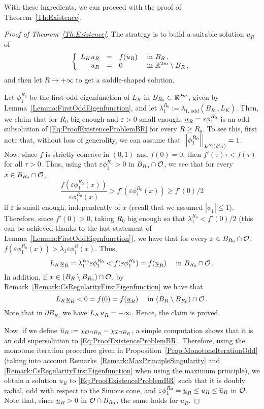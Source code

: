 With these ingredients, we can proceed with the proof of Theorem~\ref{Th:Existence}.

\begin{proof}[Proof of Theorem~\ref{Th:Existence}]
	The strategy is to build a suitable solution $u_R$ of 
	\begin{equation}
	\label{Eq:ProofExistenceProblemBR}
	\left\{\begin{array}{rcll}
	L_K u_R &=& f(u_R) & \textrm{ in } B_R\,,\\
	u_R &=& 0 & \textrm{ in }\mathbb{R}^{2m} \setminus B_R\,,
	\end{array} \right.
	\end{equation}
	and then let $R\to+ \infty$ to get a saddle-shaped solution.
	
	Let $\phi_1^{R_0}$ be the first odd eigenfunction of $L_K$ in $B_{R_0} \subset \mathbb{R}^{2m}$, given by Lemma~\ref{Lemma:FirstOddEigenfunction}, and let  $\lambda_1^{R_0} := \lambda_{1, \, \mathrm{odd}}(B_{R_0}, L_K)$. Then, we claim that for $R_0$ big enough and $\varepsilon>0$ small enough, $\underline{u}_R = \varepsilon\phi_1^{R_0} $ is an odd subsolution of \eqref{Eq:ProofExistenceProblemBR} for every $R\geq R_0$. To see this, first note that, without loss of generality, we can assume that $\left | \left |{\phi_1^{R_0}} \right | \right |_{L^\infty(B_R)}=1$. Now, since $f$ is strictly concave in $(0,1)$ and $f(0)=0$, then $f'(\tau)\tau<f(\tau)$ for all $\tau>0$. Thus, using that $\varepsilon \phi_1^{R_0}>0$ in $B_{R_0}\cap \mathcal{O}$, we see that for every $x\in B_{R_0}\cap \mathcal{O}$,
	$$
	\dfrac{f(\varepsilon \phi_1^{R_0}(x))}{\varepsilon \phi_1^{R_0}(x)} > f'(\varepsilon \phi_1^{R_0}(x)) \geq f'(0)/2
	$$
	if $\varepsilon$ is small enough, independently of $x$ (recall that we assumed $|\phi_1|\leq 1$). Therefore, since $f'(0)>0$, taking $R_0$ big enough so that $\lambda_1^{R_0} < f'(0)/2$ (this can be achieved thanks to the last statement of Lemma~\ref{Lemma:FirstOddEigenfunction}), we have that for every $x\in B_{R_0}\cap \mathcal{O}$,  $f(\varepsilon \phi_1^{R_0}(x)) > \lambda_1 \varepsilon \phi_1^R(x)$. Thus,
	$$
	L_K \underline{u}_R = \lambda_1^{R_0} \varepsilon \phi_1^{R_0} < f(\varepsilon\phi_1^{R_0}) = f(\underline{u}_R) \quad \textrm{ in } B_{R_0}\cap \mathcal{O}\,.
	$$
	In addition, if $x\in (B_R\setminus B_{R_0})\cap\mathcal{O}$, by Remark~\ref{Remark:CsRegularityFirstEigenfunction} we have that
	$$
	L_K \underline{u}_R < 0 = f(0) =  f(\underline{u}_R) \quad \textrm{ in } (B_R\setminus B_{R_0})\cap \mathcal{O}\,.
	$$
	Note that in $\partial B_{R_0}$ we have $L_K \underline{u}_R = -\infty$. Hence, the claim is proved.
	
	Now, if we define $\overline{u}_R := \chi_{\mathcal{O} \cap B_R} - \chi_{\mathcal{I} \cap B_R}$, a simple computation shows that it is an odd supersolution to \eqref{Eq:ProofExistenceProblemBR}. Therefore, using the monotone iteration procedure given in Proposition~\ref{Prop:MonotoneIterationOdd} (taking into account Remarks~\ref{Remark:MaxPrincipleSingularity} and \ref{Remark:CsRegularityFirstEigenfunction} when using the maximum principle), we obtain a solution $u_R$ to \eqref{Eq:ProofExistenceProblemBR} such that it is doubly radial, odd with respect to the Simons cone, and $\varepsilon \phi_1^{R_0} = \underline{u}_R \leq u_R \leq \overline{u}_R$ in $\mathcal{O}$. Note that, since $\underline{u}_R > 0$ in $\mathcal{O} \cap B_{R_0}$, the same holds for $u_R$.
	

\end{proof}
